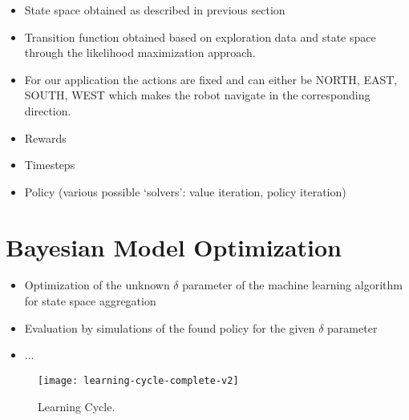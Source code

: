 % 

\begin{itemize}
	\item State space obtained as described in previous section
	\item Transition function obtained based on exploration data and state space through the likelihood maximization approach.
	\item For our application the actions are fixed and can either be \textsc{NORTH}, \textsc{EAST}, \textsc{SOUTH}, \textsc{WEST} which makes the robot navigate in the corresponding direction.
	\item Rewards
	\item Timesteps
	\item Policy (various possible `solvers': value iteration, policy iteration)
\end{itemize}

\section{Bayesian Model Optimization}
\label{sec:bayesian-model-optimization}

% 

\begin{itemize}
	\item Optimization of the unknown $\delta$ parameter of the machine learning algorithm for state space aggregation
	\item Evaluation by simulations of the found policy for the given $\delta$ parameter
	\item ...
\end{itemize}

\begin{figure}[t]
	\centering
	\texttt{[image: learning-cycle-complete-v2]}
	\caption{Learning Cycle.}
	\label{fig:learning-cycle-complete}
\end{figure}
